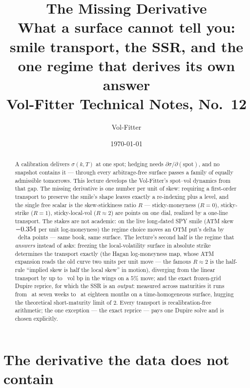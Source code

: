 \documentclass[11pt]{article}
\title{\textbf{The Missing Derivative}\\[2pt]
\large What a surface cannot tell you: smile transport, the SSR, and the
one regime that derives its own answer\\[2pt]
\normalsize Vol-Fitter Technical Notes, No.~12}
\author{Vol-Fitter}
\date{\today}
\begin{document}
\maketitle



\begin{abstract}
A calibration delivers $\sigma(k,T)$ at one spot; hedging needs
$\partial\sigma/\partial(\text{spot})$, and no snapshot contains it ---
through every arbitrage-free surface passes a family of equally
admissible tomorrows.  This lecture develops the Vol-Fitter's spot--vol
dynamics from that gap.  The missing derivative is one number per unit
of skew: requiring a first-order transport to preserve the smile's
shape leaves exactly a re-indexing plus a level, and the single free
scalar is the skew-stickiness ratio $R$ --- sticky-moneyness ($R=0$),
sticky-strike ($R=1$), sticky-local-vol ($R\approx2$) are points on one
dial, realized by a one-line transport.  The stakes are not academic:
on the live long-dated SPY smile (ATM skew $-0.354$ per unit
log-moneyness) the regime choice moves an OTM put's delta by
\smddeltagap\ delta points --- same book, same surface.  The lecture's
second half is the regime that \emph{answers} instead of asks: freezing
the local-volatility surface in absolute strike determines the
transport exactly (the Hagan log-moneyness map, whose ATM expansion
reads the old curve two units per unit move --- the famous
$R\approx2$ is the half-rule ``implied skew is half the local skew''
in motion), diverging from the linear transport by up to
\smdwinggapbp\ vol bp in the wings on a $5\%$ move; and the exact
frozen-grid Dupire reprice, for which the SSR is an \emph{output}:
measured across maturities it runs from \smdssrshort\ at seven weeks to
\smdssrlong\ at eighteen months on a time-homogeneous surface,
hugging the theoretical short-maturity limit of $2$.  Every transport
is recalibration-free arithmetic; the one exception --- the exact
reprice --- pays one Dupire solve and is chosen explicitly.
\end{abstract}

\newpage
\tableofcontents
\newpage

\section{The derivative the data does not contain}
\label{sec:missing}
\end{document}
